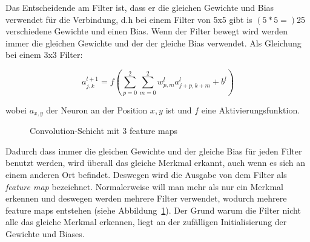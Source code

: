 \documentclass[12pt,a4paper]{report}
\begin{document}
Das Entscheidende am Filter ist, dass er die gleichen Gewichte und Bias verwendet für die Verbindung, d.h bei einem
Filter von 5x5 gibt is $(5*5=)$25 verschiedene Gewichte und einen Bias.
Wenn der Filter bewegt wird werden immer die gleichen Gewichte und der der gleiche Bias verwendet.
Als Gleichung bei einem 3x3 Filter:

\[a^{l+1}_{j,k} = f\left(\sum_{p=0}^{2}\sum_{m=0}^{2}w^l_{p,m}a^l_{j+p,k+m} + b^l\right)\]

wobei $a_{x, y}$ der Neuron an der Position $x, y$ ist und $f$ eine Aktivierungsfunktion.

\begin{figure}[h]%
    \centering
{}
    \caption{Convolution-Schicht mit 3 feature maps}%
    \label{fig:conv4}
\end{figure}

Dadurch dass immer die gleichen Gewichte und der gleiche Bias für jeden Filter benutzt werden,
wird überall das gleiche Merkmal erkannt, auch wenn es sich an einem anderen Ort befindet.
Deswegen wird die Ausgabe von dem Filter als \textit{feature map} bezeichnet.
Normalerweise will man mehr als nur ein Merkmal erkennen und deswegen werden mehrere Filter verwendet,
wodurch mehrere feature maps entstehen (siehe Abbildung~\ref{fig:conv4}).
Der Grund warum die Filter nicht alle das gleiche Merkmal erkennen, liegt an der zufälligen Initialisierung der Gewichte und Biases.
\end{document}
